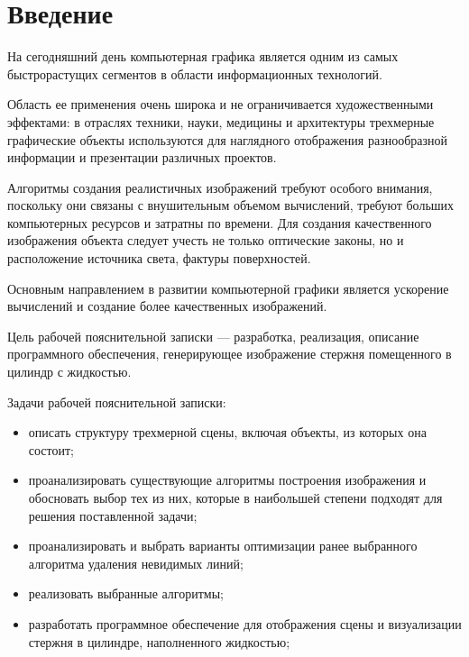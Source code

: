 \chapter*{Введение}

На сегодняшний день компьютерная графика является одним из самых быстрорастущих сегментов в области информационных технологий.

Область ее применения очень широка и не ограничивается художественными эффектами: в отраслях техники, науки, медицины и архитектуры трехмерные графические объекты используются для наглядного отображения разнообразной информации и презентации различных проектов.

Алгоритмы создания реалистичных изображений требуют особого внимания, поскольку они связаны с внушительным объемом вычислений, требуют больших компьютерных ресурсов и затратны по времени. Для создания качественного изображения объекта следует учесть не только оптические законы, но и расположение источника света, фактуры поверхностей. 

Основным направлением в развитии компьютерной графики является ускорение вычислений и создание более качественных изображений.

Цель рабочей пояснительной записки --- разработка, реализация, описание программного обеспечения, генерирующее изображение стержня помещенного в цилиндр с жидкостью.   

\newpage

Задачи рабочей пояснительной записки:

\begin{itemize}
	\item описать структуру трехмерной сцены, включая объекты, из которых она состоит;
	\item проанализировать существующие алгоритмы построения изображения и обосновать выбор тех из них, которые в наибольшей степени подходят для решения поставленной задачи;
	\item проанализировать и выбрать варианты оптимизации ранее выбранного алгоритма удаления невидимых линий;
	\item реализовать выбранные алгоритмы;
	\item разработать программное обеспечение для отображения сцены и визуализации стержня в цилиндре, наполненного жидкостью; 
\end{itemize}
